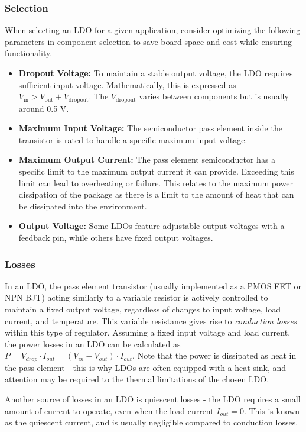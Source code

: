 \documentclass[main.tex]{subfiles}
\begin{document}
\subsubsection{Selection}
When selecting an LDO for a given application, consider optimizing the following parameters in component selection to save board space and cost while ensuring functionality. 
\begin{itemize}
    \item \textbf{Dropout Voltage:} To maintain a stable output voltage, the LDO requires sufficient input voltage. Mathematically, this is expressed as $V_{\text{in}} > V_{\text{out}} + V_{\text{dropout}}$. The $V_{\text{dropout}}$ varies between components but is usually around 0.5 V.
    \item \textbf{Maximum Input Voltage:} The semiconductor pass element inside the transistor is rated to handle a specific maximum input voltage.
    \item \textbf{Maximum Output Current:} The pass element semiconductor has a specific limit to the maximum output current it can provide. Exceeding this limit can lead to overheating or failure. This relates to the maximum power dissipation of the package as there is a limit to the amount of heat that can be dissipated into the environment. 
    \item \textbf{Output Voltage:} Some LDOs feature adjustable output voltages with a feedback pin, while others have fixed output voltages.
\end{itemize}

\subsubsection{Losses}
In an LDO, the pass element transistor (usually implemented as a PMOS FET or NPN BJT) acting similarly to a variable resistor is actively controlled to maintain a fixed output voltage, regardless of changes to input voltage, load current, and temperature. This variable resistance gives rise to \textit{conduction losses} within this type of regulator. Assuming a fixed input voltage and load current, the power losses in an LDO can be calculated as $P = V_{drop} \cdot I_{out} = (V_{in} - V_{out}) \cdot I_{out}$. Note that the power is dissipated as heat in the pass element - this is why LDOs are often equipped with a heat sink, and attention may be required to the thermal limitations of the chosen LDO. \newline

\noindent Another source of losses in an LDO is quiescent losses - the LDO requires a small amount of current to operate, even when the load current $I_{out} = 0$. This is known as the quiescent current, and is usually negligible compared to conduction losses.
\end{document}
